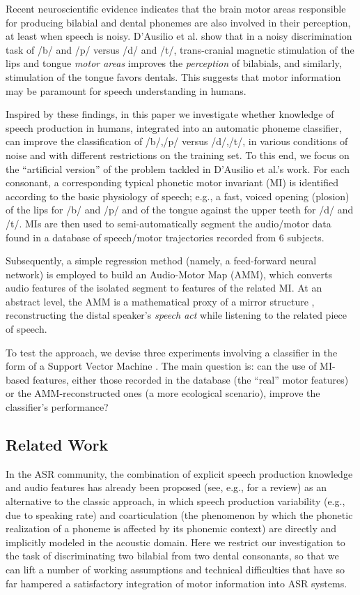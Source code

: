 \documentclass{pnastwo}
\begin{document}
\begin{article}
Recent neuroscientific evidence indicates that the brain motor areas responsible for
producing bilabial and dental phonemes are also involved in their perception, at least
when speech is noisy. D'Ausilio et al. \cite{dausilio}
show that in a noisy discrimination task of /b/ and /p/ versus /d/
and /t/, trans-cranial magnetic stimulation of the lips and tongue \emph{motor areas}
improves the \emph{perception} of bilabials, and similarly, stimulation of the tongue
favors dentals. This suggests that motor information may be paramount for
speech understanding in humans.

Inspired by these findings, in this paper we investigate whether knowledge of speech
production in humans, integrated into an automatic phoneme classifier, can improve the
classification of /b/,/p/ versus /d/,/t/, in various conditions of noise and with different
restrictions on the training set.
To this end, we focus on the ``artificial version'' of the problem tackled in D'Ausilio et al.'s
work. For each consonant, a corresponding typical phonetic motor invariant (MI) is identified
according to the basic physiology of speech; e.g., a fast, voiced opening (plosion) of the lips
for /b/ and /p/ and of the tongue against the upper teeth for /d/ and /t/.
MIs are then used to semi-automatically segment the audio/motor data found in a
database of speech/motor trajectories recorded from $6$ subjects.

Subsequently, a simple regression method (namely, a feed-forward neural network) is employed
to build an Audio-Motor Map (AMM), which converts audio features of the isolated segment to
features of the related MI. At an abstract level, the AMM is a mathematical proxy of a mirror
structure \cite{umilta-01}, reconstructing the distal speaker's \emph{speech act} while
listening to the related piece of speech.

To test the approach, we devise three experiments involving a classifier in the form of a
Support Vector Machine \cite{BGV92}. The main question is: can the use of MI-based features,
either those recorded in the database (the ``real'' motor features) or the AMM-reconstructed
ones (a more ecological scenario), improve the classifier's performance?

\subsection{Related Work}

In the ASR community, the combination of explicit speech production knowledge and audio
features has already been proposed (see, e.g., \cite{king} for a review) as an alternative to the
classic approach, in which speech production variability (e.g., due to speaking rate) and
coarticulation (the phenomenon by which the phonetic realization of a phoneme is affected
by its phonemic context) are directly and implicitly modeled in the acoustic domain.
Here we restrict our investigation to the task of discriminating two bilabial from two
dental consonants, so that we can lift a number of working assumptions and technical
difficulties that have so far hampered a satisfactory integration of motor information
into ASR systems.


\end{article}
\end{document}
